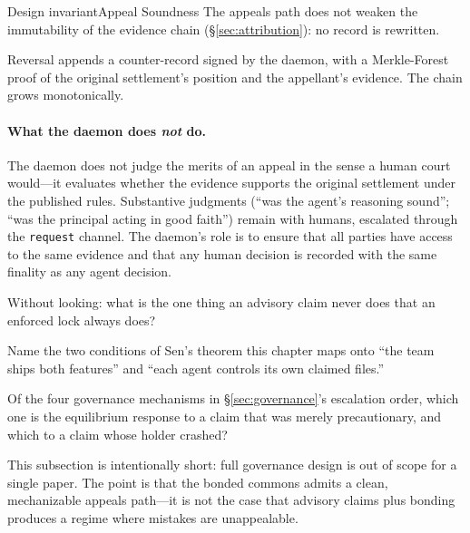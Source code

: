 \documentclass[11pt,a4paper]{article}
\theoremstyle{definition}
\theoremstyle{remark}
\begin{document}
\begin{pdclaim}{Design invariant}{Appeal Soundness}
\setlength{\parskip}{4pt plus 1pt}
\label{prop:appeal-sound}
The appeals path does not weaken the immutability of the evidence chain (\S\ref{sec:attribution}): no record is rewritten. 

Reversal appends a counter-record signed by the daemon, with a Merkle-Forest proof of the original settlement's position and the appellant's evidence. The chain grows monotonically.
\end{pdclaim}

\paragraph{What the daemon does \emph{not} do.} The daemon does not judge the merits of an appeal in the sense a human court would---it evaluates whether the evidence supports the original settlement under the published rules. Substantive judgments (``was the agent's reasoning sound''; ``was the principal acting in good faith'') remain with humans, escalated through the \texttt{request} channel. The daemon's role is to ensure that all parties have access to the same evidence and that any human decision is recorded with the same finality as any agent decision.

\pdexercisepointerone*{\ref{ex:bonded-advisory-claims}}{\pageref{ex:bonded-advisory-claims}}

\begin{pdrecitation}
\item Without looking: what is the one thing an advisory claim never does that an enforced lock always does?
\item Name the two conditions of Sen's theorem this chapter maps onto ``the team ships both features'' and ``each agent controls its own claimed files.''
\item Of the four governance mechanisms in \S\ref{sec:governance}'s escalation order, which one is the equilibrium response to a claim that was merely precautionary, and which to a claim whose holder crashed?
\end{pdrecitation}

This subsection is intentionally short: full governance design is out of scope for a single paper. The point is that the bonded commons admits a clean, mechanizable appeals path---it is not the case that advisory claims plus bonding produces a regime where mistakes are unappealable.

\end{document}
